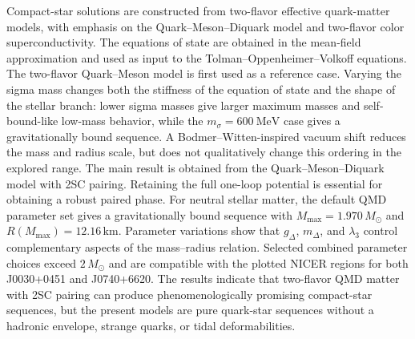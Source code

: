 Compact-star solutions are constructed from two-flavor effective quark-matter
models, with emphasis on the Quark--Meson--Diquark model and two-flavor color
superconductivity. The equations of state are obtained in the mean-field
approximation and used as input to the Tolman--Oppenheimer--Volkoff equations.
The two-flavor Quark--Meson model is first used as a reference case. Varying
the sigma mass changes both the stiffness of the equation of state and the
shape of the stellar branch: lower sigma masses give larger maximum masses and
self-bound-like low-mass behavior, while the \(m_\sigma=600~\mathrm{MeV}\)
case gives a gravitationally bound sequence. A Bodmer--Witten-inspired vacuum
shift reduces the mass and radius scale, but does not qualitatively change this
ordering in the explored range.
The main result is obtained from the Quark--Meson--Diquark model with 2SC
pairing. Retaining the full one-loop potential is essential for obtaining a
robust paired phase. For neutral stellar matter, the default QMD parameter set
gives a gravitationally bound sequence with \(M_{\max}=1.970\,M_\odot\) and
\(R(M_{\max})=12.16\,\mathrm{km}\).
Parameter variations show that \(g_\Delta\), \(m_\Delta\), and \(\lambda_3\)
control complementary aspects of the mass--radius relation. Selected combined
parameter choices exceed \(2\,M_\odot\) and are compatible with the plotted
NICER regions for both J0030+0451 and J0740+6620. The results indicate that
two-flavor QMD matter with 2SC pairing can produce phenomenologically promising
compact-star sequences, but the present models are pure quark-star sequences
without a hadronic envelope, strange quarks, or tidal deformabilities.